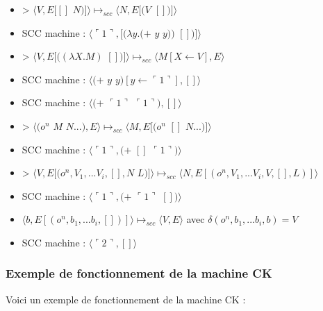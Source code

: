 \documentclass[10pt,a4paper]{article}
\begin{document}
\begin{itemize}
					\item[] >  $\langle V,E[[]$ $N)]\rangle \longmapsto_{scc} \langle N,E[(V$ $[])]\rangle$
					\item[] SCC machine : $\langle\ulcorner 1\urcorner,[(\lambda y.(+$ $y$ $y))$ $[])]\rangle$
					\item[] > $\langle V,E[((\lambda X.M)$ $[])]\rangle \longmapsto_{scc} \langle M[X\leftarrow V],E\rangle$
					\item[] SCC machine : $\langle(+$ $y$ $y)[y \leftarrow \ulcorner 1\urcorner],[]\rangle$	
					\item[] SCC machine : $\langle(+$ $\ulcorner 1\urcorner$ $\ulcorner 1\urcorner),[]\rangle$	
					\item[] > $\langle(o^{n}$ $M$ $N...),E\rangle \longmapsto_{scc} \langle M,E[(o^{n}$ $[]$ $N...)]\rangle$
					\item[] SCC machine : $\langle\ulcorner 1\urcorner,(+$ $[]$ $\ulcorner 1\urcorner)\rangle$	
					\item[] > $\langle V,E[(o^{n},V_{1},...V_{i},[],N$ $L)]\rangle \longmapsto_{scc} \langle N,E[(o^{n},V_{1},...V_{i},V,[],L)]\rangle$
					\item[] SCC machine : $\langle\ulcorner 1\urcorner,(+$ $\ulcorner 1\urcorner$ $[])\rangle$	
					\item[] $\langle b,E[(o^{n},b_{1},...b_{i},[])]\rangle \longmapsto_{scc} \langle V,E\rangle$ avec $\delta (o^{n},b_{1},...b_{i},b)=V$ 
					\item[] SCC machine : $\langle\ulcorner 2\urcorner,[]\rangle$	
				\end{itemize}
				\newpage
			
			
			
			\subsubsection{Exemple de fonctionnement de la machine CK}\label{CK}
				
				Voici un exemple de fonctionnement de la machine CK :
					
\end{document}
